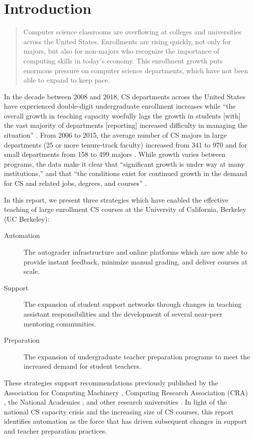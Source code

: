 \chapter{Introduction}
\label{chapter:introduction}

\begin{quote}
    Computer science classrooms are overflowing at colleges and universities across the United States. Enrollments are rising quickly, not only for majors, but also for non-majors who recognize the importance of computing skills in today's economy. This enrollment growth puts enormous pressure on computer science departments, which have not been able to expand to keep pace. \cite{Roberts:2018}
\end{quote}
In the decade between 2008 and 2018, CS departments across the United States have experienced double-digit undergraduate enrollment increases while ``the overall growth in teaching capacity woefully lags the growth in students [with] the vast majority of departments [reporting] increased difficulty in managing the situation'' \cite{TaulbeeSurvey2018}. From 2006 to 2015, the average number of CS majors in large departments (25 or more tenure-track faculty) increased from 341 to 970 and for small departments from 158 to 499 majors \cite{GenerationCS}. While growth varies between programs, the data make it clear that ``significant growth is under way at many institutions,'' and that ``the conditions exist for continued growth in the demand for CS and related jobs, degrees, and courses'' \cite{CSUndergraduateEnrollments}.

In this report, we present three strategies which have enabled the effective teaching of large enrollment CS courses at the University of California, Berkeley (UC Berkeley):
\begin{description}
    \item[Automation] The autograder infrastructure and online platforms which are now able to provide instant feedback, minimize manual grading, and deliver courses at scale.
    \item[Support] The expansion of student support networks through changes in teaching assistant responsibilities and the development of several near-peer mentoring communities.
    \item[Preparation] The expansion of undergraduate teacher preparation programs to meet the increased demand for student teachers.
\end{description}
These strategies support recommendations previously published by the Association for Computing Machinery \cite{RetentionCS}, Computing Research Association (CRA) \cite{GenerationCS}, the National Academies \cite{CSUndergraduateEnrollments}, and other research universities \cite{Maher:2015, Malan:2010, Porter:2013, Guo:2013, Hug:2015, Hug:2017, Reges:1988, Roberts:1995, Alvarado:2017, Minnes:2018, Kay:1998}. In light of the national CS capacity crisis and the increasing size of CS courses, this report identifies automation as the force that has driven subsequent changes in support and teacher preparation practices.

